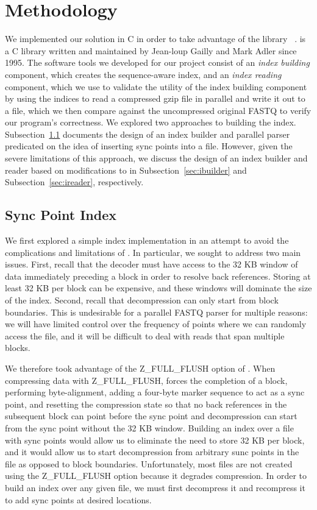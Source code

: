 \section{Methodology}
We implemented our solution in C in order to take advantage of the library
\zlib~\cite{zlib}. \zlib is a C library written and maintained by Jean-loup
Gailly and Mark Adler since 1995.
The software tools we developed for our project consist of an \emph{index
building} component, which creates the sequence-aware \gzip index, and an
\emph{index reading} component, which we use to validate the utility of the
index building component by using the indices to read a compressed gzip file in
parallel and write it out to a file, which we then compare against the
uncompressed original FASTQ to verify our program's correctness. We explored two 
approaches to building the index. Subsection~\ref{sec:sync} documents the design of 
an index builder and parallel parser predicated on the idea of inserting sync points
into a \gzip file. However, given the severe limitations of this approach, we discuss
the design of an index builder and reader based on modifications to \zran in
Subsection~\ref{sec:ibuilder} and Subsection~\ref{sec:ireader}, respectively.

\subsection{Sync Point Index}
\label{sec:sync}

We first explored a simple index implementation in an attempt to avoid the complications and 
limitations of \zran. In particular, we sought to address two main issues. First, recall that 
the decoder must have access to the 32 KB window of data immediately preceding a \gzip block 
in order to resolve back references. Storing at least 32 KB per \gzip block can be expensive, 
and these windows will dominate the size of the index. Second, recall that decompression can 
only start from block boundaries. This is undesirable for a parallel FASTQ parser for multiple 
reasons: we will have limited control over the frequency of points where we can randomly access 
the \gzip file, and it will be difficult to deal with reads that span multiple \gzip blocks.

We therefore took advantage of the Z\_FULL\_FLUSH option of \zlib. When compressing data with
Z\_FULL\_FLUSH, \zlib forces the completion of a \gzip block, performing byte-alignment, adding
a four-byte marker sequence to act as a sync point, and resetting the compression state so that
no back references in the subsequent block can point before the sync point and decompression can 
start from the sync point without the 32 KB window. Building an index over a \gzip file with sync
points would allow us to eliminate the need to store 32 KB per block, and it would allow us to
start decompression from arbitrary sunc points in the file as opposed to block boundaries. 
Unfortunately, most \gzip files are not created using the Z\_FULL\_FLUSH option because it degrades
compression. In order to build an index over any given \gzip file, we must first decompress it and
recompress it to add sync points at desired locations. 

